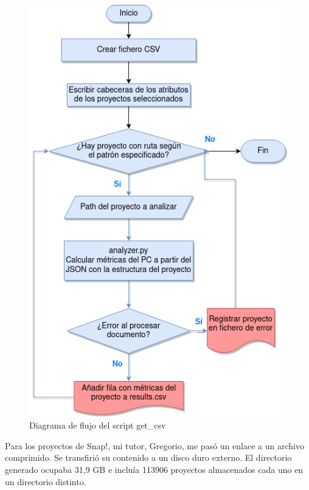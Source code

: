 \documentclass[a4paper, 12pt]{book}
\begin{document}
\begin{figure}[ht]
    \centering
    \includegraphics[height=.6\textheight]{img/script_extraccion_datos.png}
    \caption{Diagrama de flujo del script get\_csv}
    \label{fig:script_extract}
\end{figure}

Para los proyectos de Snap!, mi tutor, Gregorio, me pasó un enlace a un archivo comprimido. Se transfirió su contenido a un disco duro externo. El directorio generado ocupaba 31,9 GB e incluía 113906 proyectos almacenados cada uno en un directorio distinto.
\end{document}
